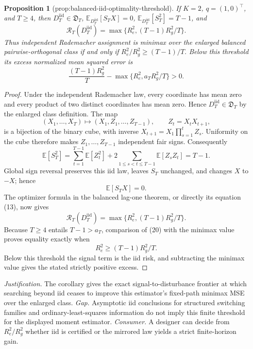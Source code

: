 \documentclass{article}
\newtheorem{proposition}{Proposition}
\begin{document}
\begin{proposition}[prop:balanced-iid-optimality-threshold]\label{prop:balanced-iid-optimality-threshold}
If \(K=2\), \(q=(1,0)^{\top}\), and \(T\ge4\), then \(D_T^{\mathrm{iid}}\in\mathfrak D_T\), \(\mathbb E_{D_T^{\mathrm{iid}}}[S_TX]=0\), \(\mathbb E_{D_T^{\mathrm{iid}}}[S_T^2]=T-1\), and
\[
\mathcal R_T(D_T^{\mathrm{iid}})=\max\{R_e^2,(T-1)R_g^2/T\}.
\]
Thus independent Rademacher assignment is minimax over the enlarged balanced pairwise-orthogonal class if and only if \(R_e^2/R_g^2\ge(T-1)/T\).  Below this threshold its excess normalized mean squared error is
\[
\frac{(T-1)R_g^2}{T}-\max\{R_e^2,a_TR_g^2/T\}>0.
\]
\end{proposition}
\begin{proof}
Under the independent Rademacher law, every coordinate has mean zero and every product of two distinct coordinates has mean zero.  Hence \(D_T^{\mathrm{iid}}\in\mathfrak D_T\) by the enlarged class definition.  The map
\[
(X_1,\ldots,X_T)\longmapsto(X_1,Z_1,\ldots,Z_{T-1}),
\qquad Z_t=X_tX_{t+1},
\]
is a bijection of the binary cube, with inverse \(X_{t+1}=X_1\prod_{s=1}^{t}Z_s\).  Uniformity on the cube therefore makes \(Z_1,\ldots,Z_{T-1}\) independent fair signs.  Consequently
\[
\mathbb E[S_T^2]
=\sum_{t=1}^{T-1}\mathbb E[Z_t^2]
+2\sum_{1\le s<t\le T-1}\mathbb E[Z_sZ_t]
=T-1.
\tag{18}
\]
Global sign reversal preserves this iid law, leaves \(S_T\) unchanged, and changes \(X\) to \(-X\); hence
\[
\mathbb E[S_TX]=0.
\tag{19}
\]
The optimizer formula in the balanced lag-one theorem, or directly its equation (13), now gives
\[
\mathcal R_T(D_T^{\mathrm{iid}})
=\max\{R_e^2,(T-1)R_g^2/T\}.
\tag{20}
\]
Because \(T\ge4\) entails \(T-1>a_T\), comparison of (20) with the minimax value proves equality exactly when
\[
R_e^2\ge (T-1)R_g^2/T.
\]
Below this threshold the signal term is the iid risk, and subtracting the minimax value gives the stated strictly positive excess.
\end{proof}
\par\smallskip\noindent \textit{Justification.} The corollary gives the exact signal-to-disturbance frontier at which searching beyond iid ceases to improve this estimator's fixed-path minimax MSE over the enlarged class. \textit{Gap.} Asymptotic iid conclusions for structured switching families and ordinary-least-squares information do not imply this finite threshold for the displayed moment estimator. \textit{Consumer.} A designer can decide from \(R_e^2/R_g^2\) whether iid is certified or the mirrored law yields a strict finite-horizon gain.
\end{document}
